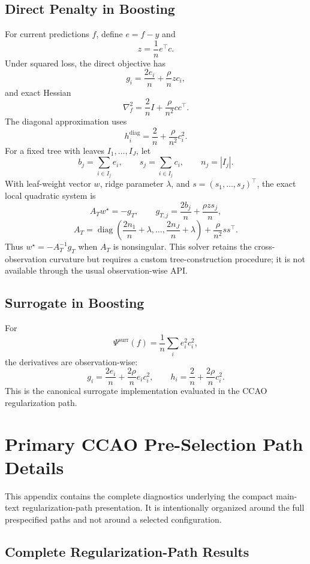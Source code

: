 \documentclass[10pt]{article}
\theoremstyle{definition}
\newcommand{\diag}{\operatorname{diag}}
\newcommand{\1}{\mathbf{1}}
\begin{document}
\subsection{Direct Penalty in Boosting}

For current predictions $f$, define $e=f-y$ and
\[
z=\frac{1}{n}e^\top c.
\]
Under squared loss, the direct objective has
\[
g_i=\frac{2e_i}{n}+\frac{\rho}{n}zc_i,
\]
and exact Hessian
\[
\nabla_f^2
=
\frac{2}{n}I+\frac{\rho}{n^2}cc^\top.
\]
The diagonal approximation uses
\[
h_i^{\mathrm{diag}}
=
\frac{2}{n}+\frac{\rho}{n^2}c_i^2.
\]
For a fixed tree with leaves $I_1,\ldots,I_J$, let
\[
b_j=\sum_{i\in I_j}e_i,
\qquad
s_j=\sum_{i\in I_j}c_i,
\qquad
n_j=|I_j|.
\]
With leaf-weight vector $w$, ridge parameter $\lambda$, and $s=(s_1,\ldots,s_J)^\top$, the exact local quadratic system is
\[
A_Tw^\star=-g_T,
\qquad
g_{T,j}=\frac{2b_j}{n}+\frac{\rho z s_j}{n},
\]
\[
A_T
=
\diag\!\left(\frac{2n_1}{n}+\lambda,\ldots,\frac{2n_J}{n}+\lambda\right)
+\frac{\rho}{n^2}ss^\top.
\]
Thus $w^\star=-A_T^{-1}g_T$ when $A_T$ is nonsingular. This solver retains the cross-observation curvature but requires a custom tree-construction procedure; it is not available through the usual observation-wise API.

\subsection{Surrogate in Boosting}

For
\[
\Psi^{\mathrm{surr}}(f)
=
\frac{1}{n}\sum_i e_i^2c_i^2,
\]
the derivatives are observation-wise:
\[
g_i=\frac{2e_i}{n}+\frac{2\rho}{n}e_ic_i^2,
\qquad
h_i=\frac{2}{n}+\frac{2\rho}{n}c_i^2.
\]
This is the canonical surrogate implementation evaluated in the CCAO regularization path.

\section{Primary CCAO Pre-Selection Path Details}
\label{app:ccao_path_details}

This appendix contains the complete diagnostics underlying the compact main-text
regularization-path presentation. It is intentionally organized around the full
prespecified paths and not around a selected configuration.

\subsection{Complete Regularization-Path Results}
\end{document}

